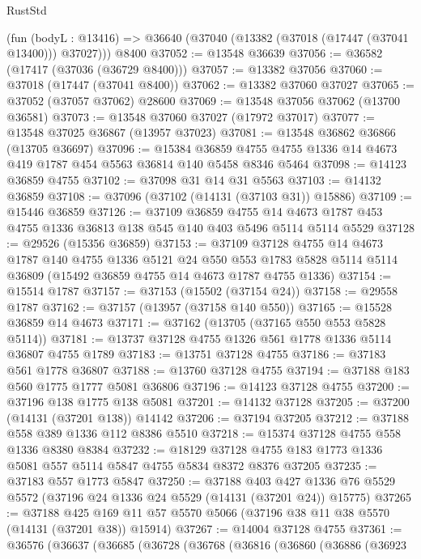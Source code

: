 \begin{lexlean}{RustStd}
\begin{coremodule}
    (fun (bodyL : @13416) => @36640 (@37040 (@13382 (@37018 (@17447 (@37041 @13400))) @37027)))
    @8400
@37052 := @13548 @36639
@37056 := @36582 (@17417 (@37036 (@36729 @8400)))
@37057 := @13382 @37056
@37060 := @37018 (@17447 (@37041 @8400))
@37062 := @13382 @37060 @37027
@37065 := @37052 (@37057 @37062) @28600
@37069 := @13548 @37056 @37062 (@13700 @36581)
@37073 := @13548 @37060 @37027 (@17972 @37017)
@37077 := @13548 @37025 @36867 (@13957 @37023)
@37081 := @13548 @36862 @36866 (@13705 @36697)
@37096 := @15384
    @36859
    @4755
    @4755
    @1336
    @14
    @4673
    @419
    @1787
    @454
    @5563
    @36814
    @140
    @5458
    @8346
    @5464
@37098 := @14123 @36859 @4755
@37102 := @37098 @31 @14 @31 @5563
@37103 := @14132 @36859
@37108 := @37096 (@37102 (@14131 (@37103 @31)) @15886)
@37109 := @15446 @36859
@37126 := @37109
    @36859
    @4755
    @14
    @4673
    @1787
    @453
    @4755
    @1336
    @36813
    @138
    @545
    @140
    @403
    @5496
    @5114
    @5114
    @5529
@37128 := @29526 (@15356 @36859)
@37153 := @37109
    @37128
    @4755
    @14
    @4673
    @1787
    @140
    @4755
    @1336
    @5121
    @24
    @550
    @553
    @1783
    @5828
    @5114
    @5114
    @36809
    (@15492 @36859 @4755 @14 @4673 @1787 @4755 @1336)
@37154 := @15514 @1787
@37157 := @37153 (@15502 (@37154 @24))
@37158 := @29558 @1787
@37162 := @37157 (@13957 (@37158 @140 @550))
@37165 := @15528 @36859 @14 @4673
@37171 := @37162 (@13705 (@37165 @550 @553 @5828 @5114))
@37181 := @13737 @37128 @4755 @1326 @561 @1778 @1336 @5114 @36807 @4755 @1789
@37183 := @13751 @37128 @4755
@37186 := @37183 @561 @1778 @36807
@37188 := @13760 @37128 @4755
@37194 := @37188 @183 @560 @1775 @1777 @5081 @36806
@37196 := @14123 @37128 @4755
@37200 := @37196 @138 @1775 @138 @5081
@37201 := @14132 @37128
@37205 := @37200 (@14131 (@37201 @138)) @14142
@37206 := @37194 @37205
@37212 := @37188 @558 @389 @1336 @112 @8386 @5510
@37218 := @15374 @37128 @4755 @558 @1336 @8380 @8384
@37232 := @18129 @37128 @4755 @183 @1773 @1336 @5081 @557 @5114 @5847 @4755 @5834 @8372 @8376 @37205
@37235 := @37183 @557 @1773 @5847
@37250 := @37188
    @403
    @427
    @1336
    @76
    @5529
    @5572
    (@37196 @24 @1336 @24 @5529 (@14131 (@37201 @24)) @15775)
@37265 := @37188
    @425
    @169
    @11
    @57
    @5570
    @5066
    (@37196 @38 @11 @38 @5570 (@14131 (@37201 @38)) @15914)
@37267 := @14004 @37128 @4755
@37361 := @36576
    (@36637
      (@36685
        (@36728
          (@36768
            (@36816
              (@36860
                (@36886
                  (@36923

\end{coremodule}
\end{lexlean}

